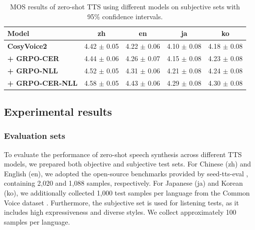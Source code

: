 \documentclass{article}
\begin{document}
\begin{table}[!t]
	\centering
    \vspace{-0.3cm}
	\caption{MOS results of zero-shot TTS using different models on subjective sets with 95\% confidence intervals.}
	\renewcommand\arraystretch{0.8}
        \tabcolsep=0.08cm
        \footnotesize
	\label{tab:zs-mos}
	\begin{tabular}{lcccc}
        \toprule
        Model & zh & en & ja & ko \\
        \midrule
        \textbf{CosyVoice2} & 4.42 $\pm$ 0.05 & 4.22 $\pm$ 0.06 & 4.10 $\pm$ 0.08 & 4.18 $\pm$ 0.08  \\
        \textbf{+ GRPO-CER} & 4.44 $\pm$ 0.06 & 4.26 $\pm$ 0.07 & 4.15 $\pm$ 0.08 & 4.23 $\pm$ 0.08  \\
        \textbf{+ GRPO-NLL} & 4.52 $\pm$ 0.05 & 4.31 $\pm$ 0.06 & 4.21 $\pm$ 0.08 & 4.24 $\pm$ 0.08  \\
        \textbf{+ GRPO-CER-NLL} & 4.58 $\pm$ 0.05 & 4.43 $\pm$ 0.06 & 4.29 $\pm$ 0.08 & 4.30 $\pm$ 0.08  \\
        \bottomrule
    \end{tabular}
		\vspace{-0.4cm}
\end{table}

\vspace{-0.3cm}
\subsection{Experimental results}
\label{ssec:result}
\vspace{-0.2cm}

\subsubsection{Evaluation sets}
\vspace{-0.2cm}
To evaluate the performance of zero-shot speech synthesis across different TTS models, we prepared both objective and subjective test sets. For Chinese (zh) and English (en), we adopted the open-source benchmarks provided by seed-tts-eval \cite{seedtts}, containing 2,020 and 1,088 samples, respectively. For Japanese (ja) and Korean (ko), we additionally collected 1,000 test samples per language from the Common Voice dataset \cite{commonvoice}. Furthermore, the subjective set is used for listening tests, as it includes high expressiveness and diverse styles. We collect approximately 100 samples per language.
\end{document}
